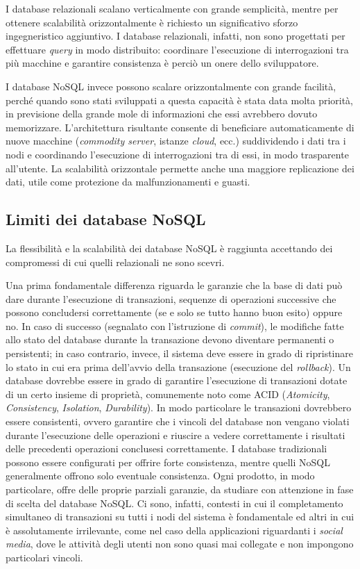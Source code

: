 I database relazionali scalano verticalmente con grande semplicità, mentre per ottenere scalabilità orizzontalmente è richiesto un significativo sforzo ingegneristico aggiuntivo. 
I database relazionali, infatti, non sono progettati per effettuare \textit{query} in modo distribuito: coordinare l’esecuzione di interrogazioni tra più macchine e garantire consistenza 
è perciò un onere dello sviluppatore.

I database NoSQL invece possono scalare orizzontalmente con grande facilità, perché quando sono stati sviluppati a questa capacità è stata data molta priorità, in previsione della 
grande mole di informazioni che essi avrebbero dovuto memorizzare. L’architettura risultante consente di beneficiare automaticamente di nuove macchine (\textit{commodity server}, istanze 
\textit{cloud}, ecc.) suddividendo i dati tra i nodi e coordinando l’esecuzione di interrogazioni tra di essi, in modo trasparente all’utente. La scalabilità orizzontale permette anche una 
maggiore replicazione dei dati, utile come protezione da malfunzionamenti e guasti.


\subsection{Limiti dei database NoSQL}

La flessibilità e la scalabilità dei database NoSQL è raggiunta accettando dei compromessi di cui quelli relazionali ne sono scevri.

Una prima fondamentale differenza riguarda le garanzie che la base di dati può dare durante l’esecuzione di transazioni, sequenze di operazioni successive che possono concludersi 
correttamente (se e solo se tutto hanno buon esito) oppure no. In caso di successo (segnalato con l’istruzione di \textit{commit}), le modifiche fatte allo stato del database durante 
la transazione devono diventare permanenti o persistenti; in caso contrario, invece, il sistema deve essere in grado di ripristinare lo stato in cui era prima dell’avvio della 
transazione (esecuzione del \textit{rollback}). Un database dovrebbe essere in grado di garantire l’esecuzione di transazioni dotate di un certo insieme di proprietà, comunemente noto 
come ACID (\textit{Atomicity}, \textit{Consistency}, \textit{Isolation}, \textit{Durability}). In modo particolare le transazioni dovrebbero essere consistenti, ovvero garantire che i vincoli del database non vengano
violati durante l’esecuzione delle operazioni e riuscire a vedere correttamente i risultati delle precedenti operazioni conclusesi correttamente. I database tradizionali possono 
essere configurati per offrire forte consistenza, mentre quelli NoSQL generalmente offrono solo eventuale consistenza. Ogni prodotto, in modo particolare, offre delle proprie 
parziali garanzie, da studiare con attenzione in fase di scelta del database NoSQL. Ci sono, infatti, contesti in cui il completamento simultaneo di transazioni su tutti i nodi 
del sistema è fondamentale ed altri in cui è assolutamente irrilevante, come nel caso della applicazioni riguardanti i \textit{social media}, dove le attività degli utenti non sono quasi 
mai collegate e non impongono particolari vincoli. 

